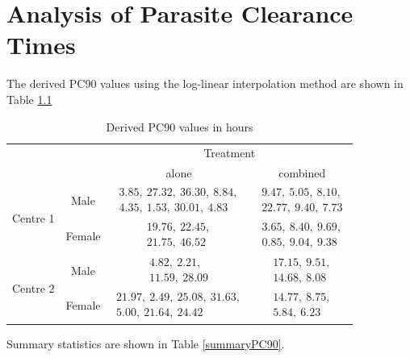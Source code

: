 \chapter{Analysis of Parasite Clearance Times}\label{analysis}
The derived PC90 values using the log-linear interpolation method are shown in Table \ref{derivedPC90}
\begin{table}[h]
\centering
\caption{Derived PC90 values in hours}\label{derivedPC90}
\begin{tabular}{|cc|c|c|}
\hline
&&\multicolumn{2}{c|}{Treatment}\\
&&alone&combined\\\hline
\multirow{2}{*}{Centre 1}&Male&$\begin{array}{c}3.85,\ 27.32,\ 36.30,\  8.84,\\4.35,\  1.53,\ 30.01,\  4.83\end{array}$&$\begin{array}{c}9.47,\  5.05,\  8.10,\\22.77,\  9.40,\  7.73\end{array}$\\\cline{2-4}
&Female&$\begin{array}{c}19.76,\ 22.45,\\21.75,\ 46.52\end{array}$&$\begin{array}{c}3.65,\ 8.40 ,\ 9.69,\\0.85,\ 9.04,\ 9.38\end{array}$\\\hline
\multirow{2}{*}{Centre 2}&Male&$\begin{array}{c}4.82,\ 2.21,\\11.59,\ 28.09\end{array}$&$\begin{array}{c}17.15,\ 9.51,\\14.68,\ 8.08\end{array}$\\\cline{2-4}
&Female&$\begin{array}{c}21.97,\ 2.49,\ 25.08,\ 31.63,\\5.00,\ 21.64,\ 24.42\end{array}$&$\begin{array}{c}14.77,\  8.75,\\5.84,\ 6.23\end{array}$\\\hline
\end{tabular}
\end{table}
Summary statistics are shown in Table \ref{summaryPC90}.
